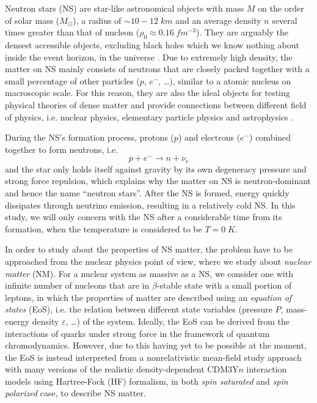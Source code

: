 
Neutron stars (\gls{NS}) are star-like astronomical objects with mass $M$ on the order of solar mass ($M_\odot$), a radius of $\sim 10-12\;km$ and an average density $n$ several times greater than that of nucleon ($\rho_0 \approx 0.16\;fm^{-3}$). They are arguably the densest accessible objects, excluding black holes which we know nothing about inside the event horizon, in the universe \cite{baym1975neutron}. Due to extremely high density, the matter on \gls{NS} mainly consists of neutrons that are closely packed together with a small percentage of other particles ($p$, $e^-$, \ldots), similar to a atomic nucleus on macroscopic scale. For this reason, they are also the ideal objects for testing physical theories of dense matter and provide connections between different field of physics, i.e. nuclear physics, elementary particle physics and astrophysics \cite{lattimer2004physics}.\par
During the \gls{NS}'s formation process, protons ($p$) and electrons ($e^-$) combined together to form neutrons, i.e.
\begin{equation}
        p + e^- \longrightarrow n + \nu_e
\end{equation}
and the star only holds itself against gravity by its own degeneracy pressure and strong force repulsion, which explains why the matter on \gls{NS} is neutron-dominant and hence the name ``neutron stars''. After the \gls{NS} is formed, energy quickly dissipates through neutrino emission, resulting in a relatively cold \gls{NS}. In this study, we will only concern with the \gls{NS} after a considerable time from its formation, when the temperature is considered to be $T=0\;K$.\par
In order to study about the properties of \gls{NS} matter, the problem have to be approached from the nuclear physics point of view, where we study about \emph{nuclear matter} (\gls{NM}). For a nuclear system as massive as a \gls{NS}, we consider one with infinite number of nucleons that are in $\beta$-stable state with a small portion of leptons, in which the properties of matter are described using an \emph{equation of states} (\gls{EoS}), i.e. the relation between different state variables (pressure $P$, mass-energy density $\varepsilon$, \ldots) of the system. Ideally, the \gls{EoS} can be derived from the interactions of quarks under strong force in the framework of quantum chromodynamics. However, due to this having yet to be possible at the moment, the \gls{EoS} is instead interpreted from a nonrelativistic mean-field study approach with many versions of the realistic density-dependent CDM3Y$n$ interaction models \cite{khoa1995equation,khoa2007mean} using Hartree-Fock (\gls{HF}) formalism, in both \emph{spin saturated} and \emph{spin polarized} case, to describe \gls{NS} matter.

